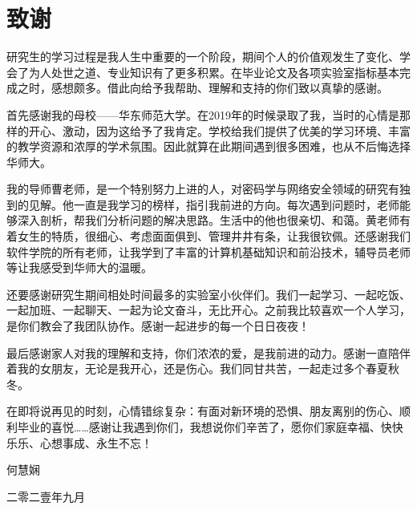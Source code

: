 {\fangsong
	\chapter*{致\qquad 谢}\vskip 2mm
	\vspace{-1cm}
		\large{

研究生的学习过程是我人生中重要的一个阶段，期间个人的价值观发生了变化、学会了为人处世之道、专业知识有了更多积累。在毕业论文及各项实验室指标基本完成之时，感想颇多。借此向给予我帮助、理解和支持的你们致以真挚的感谢。

首先感谢我的母校——华东师范大学。在2019年的时候录取了我，当时的心情是那样的开心、激动，因为这给予了我肯定。学校给我们提供了优美的学习环境、丰富的教学资源和浓厚的学术氛围。因此就算在此期间遇到很多困难，也从不后悔选择华师大。

我的导师曹老师，是一个特别努力上进的人，对密码学与网络安全领域的研究有独到的见解。他一直是我学习的榜样，指引我前进的方向。每次遇到问题时，老师能够深入剖析，帮我们分析问题的解决思路。生活中的他也很亲切、和蔼。黄老师有着女生的特质，很细心、考虑面面俱到、管理井井有条，让我很钦佩。还感谢我们软件学院的所有老师，让我学到了丰富的计算机基础知识和前沿技术，辅导员老师等让我感受到华师大的温暖。

还要感谢研究生期间相处时间最多的实验室小伙伴们。我们一起学习、一起吃饭、一起加班、一起聊天、一起为论文奋斗，无比开心。之前我比较喜欢一个人学习，是你们教会了我团队协作。感谢一起进步的每一个日日夜夜！

最后感谢家人对我的理解和支持，你们浓浓的爱，是我前进的动力。感谢一直陪伴着我的女朋友，无论是我开心，还是伤心。我们同甘共苦，一起走过多个春夏秋冬。

在即将说再见的时刻，心情错综复杂：有面对新环境的恐惧、朋友离别的伤心、顺利毕业的喜悦……感谢让我遇到你们，我想说你们辛苦了，愿你们家庭幸福、快快乐乐、心想事成、永生不忘！	
	}
	
	\vspace{0.2cm}
	
	\vspace{0.2cm} \hspace{9.8cm}
	何慧娴
	
	\hspace{9cm}  二零二壹年九月

} 